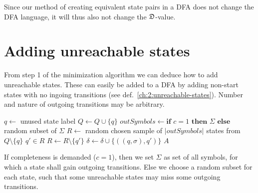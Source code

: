 \begin{corollary}
	Since our method of creating equivalent state pairs in a DFA does not change the DFA language, it will thus also not change the $\mathfrak{D}$-value.
\end{corollary}

\section{Adding unreachable states}

From step 1 of the minimization algorithm we can deduce how to add unreachable states. These can easily be added to a DFA by adding non-start states with no ingoing transitions (see def.~\ref{ch:2:unreachable-states}). Number and nature of outgoing transitions may be arbitrary.

\vspace{0.2cm}
\begin{algorithmic}[1]
		\State $q \gets$ unused state label
		\State $Q \gets Q \cup \{ q \}$
        \State $outSymbols \gets \textbf{if } c = 1 \textbf{ then } \Sigma \textbf{ else}$ random subset of $\Sigma$
		\State $R \gets$ random chosen sample of $|outSymbols|$ states from $Q \setminus \{q\}$
			\State $q' \in R$
			\State $R \gets R \setminus \{q'\}$
			\State $\delta \gets \delta \cup \{ ((q, \sigma), q') \}$
		\EndFor
	\EndFor
	\State \Return $A$
	\EndFunction
\end{algorithmic}
\vspace{0.2cm}
If completeness is demanded ($c=1$), then we set $\Sigma$ as set of all symbols, for which a state shall gain outgoing transitions. Else we choose a random subset for each state, such that some unreachable states may miss some outgoing transitions.
